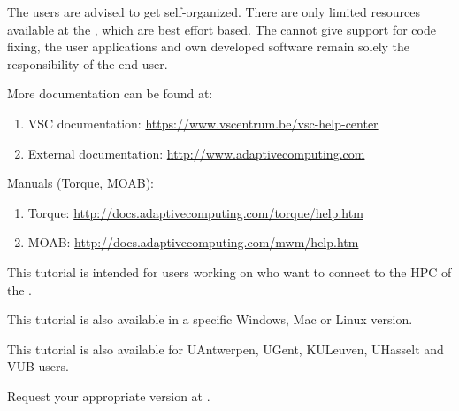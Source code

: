  The users are advised to get self-organized. There are
only limited resources available at the \hpc, which are best effort based.
The \hpc cannot give support for code fixing, the user applications and own
developed software remain solely the responsibility of the end-user.

More documentation can be found at:

\begin{enumerate}
  \item  VSC documentation: \url{https://www.vscentrum.be/vsc-help-center}
  \item  External documentation: \url{http://www.adaptivecomputing.com}
\end{enumerate}

Manuals (Torque, MOAB):

\begin{enumerate}
  \item  Torque: \url{http://docs.adaptivecomputing.com/torque/help.htm}
  \item  MOAB: \url{http://docs.adaptivecomputing.com/mwm/help.htm}
\end{enumerate}

This tutorial \strong{(\version)} is intended for users working on \strong{\OS} who want to connect to the HPC of the \strong{\university}.

This tutorial is also available in a specific Windows, Mac or Linux version.

This tutorial is also available for UAntwerpen, UGent, KULeuven, UHasselt and VUB users.

Request your appropriate version at \helpdeskemail.


